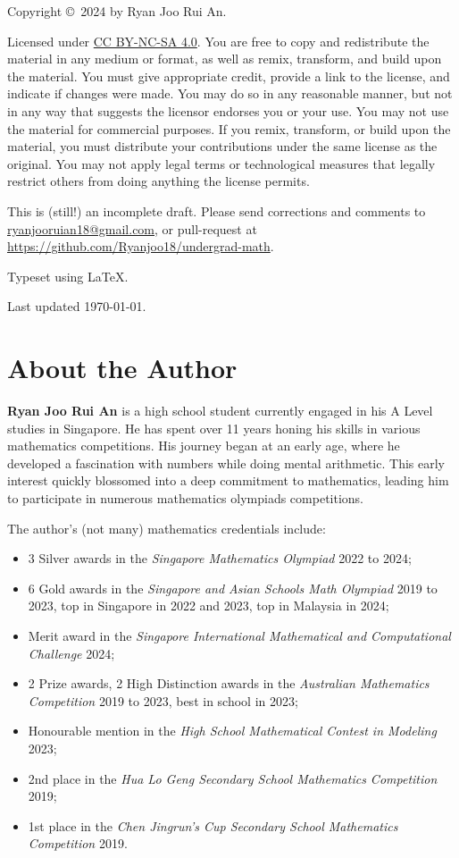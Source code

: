 \vfill

Copyright \copyright \ 2024 by Ryan Joo Rui An.

Licensed under \href{https://creativecommons.org/licenses/by-nc-sa/4.0/}{CC BY-NC-SA 4.0}. You are free to copy and redistribute the material in any medium or format, as well as remix, transform, and build upon the material. You must give appropriate credit, provide a link to the license, and indicate if changes were made. You may do so in any reasonable manner, but not in any way that suggests the licensor endorses you or your use. You may not use the material for commercial purposes. If you remix, transform, or build upon the material, you must distribute your contributions under the same license as the original. You may not apply legal terms or technological measures that legally restrict others from doing anything the license permits.

This is (still!) an incomplete draft. Please send corrections and comments to \url{ryanjooruian18@gmail.com}, or pull-request at \url{https://github.com/Ryanjoo18/undergrad-math}.

Typeset using \LaTeX.

Last updated \today.
\pagebreak

\frontmatter
\section*{About the Author}
\textbf{Ryan Joo Rui An} is a high school student currently engaged in his A Level studies in Singapore. He has spent over 11 years honing his skills in various mathematics competitions. His journey began at an early age, where he developed a fascination with numbers while doing mental arithmetic. This early interest quickly blossomed into a deep commitment to mathematics, leading him to participate in numerous mathematics olympiads competitions.

The author's (not many) mathematics credentials include:
\begin{itemize}
\item 3 Silver awards in the \emph{Singapore Mathematics Olympiad} 2022 to 2024;
\item 6 Gold awards in the \emph{Singapore and Asian Schools Math Olympiad} 2019 to 2023, top in Singapore in 2022 and 2023, top in Malaysia in 2024;
\item Merit award in the \emph{Singapore International Mathematical and Computational Challenge} 2024;
\item 2 Prize awards, 2 High Distinction awards in the \emph{Australian Mathematics Competition} 2019 to 2023, best in school in 2023;
\item Honourable mention in the \emph{High School Mathematical Contest in Modeling} 2023;
\item 2nd place in the \emph{Hua Lo Geng Secondary School Mathematics Competition} 2019;
\item 1st place in the \emph{Chen Jingrun's Cup Secondary School Mathematics Competition} 2019.
\end{itemize}

